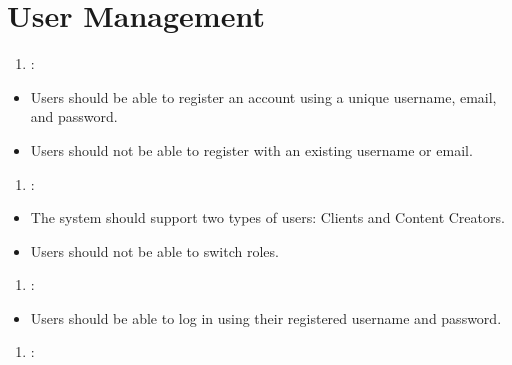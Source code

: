 \documentclass[letterpaper,10pt,english]{sphinxmanual}
\begin{document}
\section{User Management}
\label{\detokenize{modules/requirements:user-management}}\begin{enumerate}
%
\item {} 
\sphinxAtStartPar
{}:

\end{enumerate}
\begin{itemize}
\item {} 
\sphinxAtStartPar
Users should be able to register an account using a unique username, email, and password.

\item {} 
\sphinxAtStartPar
Users should not be able to register with an existing username or email.

\end{itemize}
\begin{enumerate}
%
\setcounter{enumi}{1}
\item {} 
\sphinxAtStartPar
{}:

\end{enumerate}
\begin{itemize}
\item {} 
\sphinxAtStartPar
The system should support two types of users: Clients and Content Creators.

\item {} 
\sphinxAtStartPar
Users should not be able to switch roles.

\end{itemize}
\begin{enumerate}
%
\setcounter{enumi}{2}
\item {} 
\sphinxAtStartPar
{}:

\end{enumerate}
\begin{itemize}
\item {} 
\sphinxAtStartPar
Users should be able to log in using their registered username and password.

\end{itemize}
\begin{enumerate}
%
\setcounter{enumi}{3}
\item {} 
\sphinxAtStartPar
{}:

\end{enumerate}
\end{document}
